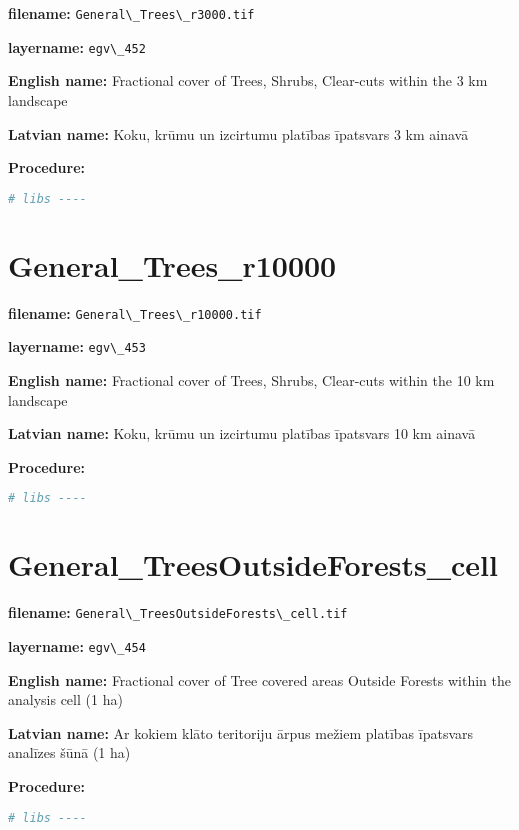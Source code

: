 \documentclass[
]{book}
\newcommand{\passthrough}[1]{#1}
\begin{document}
\textbf{filename:} \passthrough{\lstinline!General\_Trees\_r3000.tif!}

\textbf{layername:} \passthrough{\lstinline!egv\_452!}

\textbf{English name:} Fractional cover of Trees, Shrubs, Clear-cuts within the 3 km landscape

\textbf{Latvian name:} Koku, krūmu un izcirtumu platības īpatsvars 3 km ainavā

\textbf{Procedure:}

\begin{lstlisting}[language=R]
# libs ----
\end{lstlisting}

\section{General\_Trees\_r10000}\label{ch06.453}

\textbf{filename:} \passthrough{\lstinline!General\_Trees\_r10000.tif!}

\textbf{layername:} \passthrough{\lstinline!egv\_453!}

\textbf{English name:} Fractional cover of Trees, Shrubs, Clear-cuts within the 10 km landscape

\textbf{Latvian name:} Koku, krūmu un izcirtumu platības īpatsvars 10 km ainavā

\textbf{Procedure:}

\begin{lstlisting}[language=R]
# libs ----
\end{lstlisting}

\section{General\_TreesOutsideForests\_cell}\label{ch06.454}

\textbf{filename:} \passthrough{\lstinline!General\_TreesOutsideForests\_cell.tif!}

\textbf{layername:} \passthrough{\lstinline!egv\_454!}

\textbf{English name:} Fractional cover of Tree covered areas Outside Forests within the analysis cell (1 ha)

\textbf{Latvian name:} Ar kokiem klāto teritoriju ārpus mežiem platības īpatsvars analīzes šūnā (1 ha)

\textbf{Procedure:}

\begin{lstlisting}[language=R]
# libs ----
\end{lstlisting}
\end{document}
